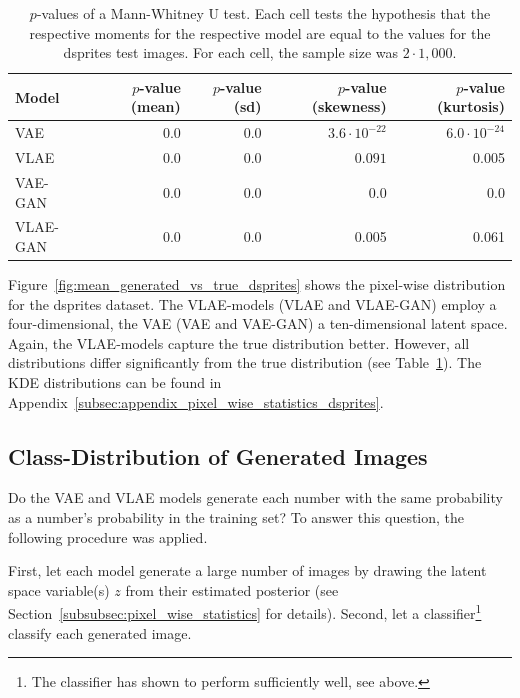 \begin{table}
    \begin{tabular}{lrrrr}
        \toprule
        Model              & $p$-value (mean) & $p$-value (sd) & $p$-value (skewness) & $p$-value (kurtosis) \\
        \midrule
        \ac{VAE}           & $0.0$            & 0.0            & $3.6\cdot 10^{-22}$  & $6.0\cdot 10^{-24}$  \\
        \ac{VLAE}          & 0.0              & $0.0$          & $0.091$              & 0.005                \\
        \ac{VAE}-\ac{GAN}  & 0.0              & 0.0            & 0.0                  & 0.0                  \\
        \ac{VLAE}-\ac{GAN} & 0.0              & $0.0$          & 0.005                & 0.061                \\
        \bottomrule
    \end{tabular}
    \caption{$p$-values of a Mann-Whitney U test. Each cell tests the hypothesis that the respective moments for the respective model are equal to the values for the dsprites test images. For each cell, the sample size was $2\cdot 1,000$.}
    \label{tab:vae-vlae-dsprites}
\end{table}

Figure~\ref{fig:mean_generated_vs_true_dsprites} shows the pixel-wise distribution for the dsprites dataset.
The \ac{VLAE}-models (\ac{VLAE} and \ac{VLAE}-\ac{GAN}) employ a four-dimensional, the \ac{VAE} (\ac{VAE} and \ac{VAE}-\ac{GAN}) a ten-dimensional latent space.
Again, the \ac{VLAE}-models capture the true distribution better.
However, all distributions differ significantly from the true distribution (see Table~\ref{tab:vae-vlae-dsprites}).
The \ac{KDE} distributions can be found in Appendix~\ref{subsec:appendix_pixel_wise_statistics_dsprites}.

\subsection{Class-Distribution of Generated Images}\label{subsec:class-distribution-of-generated-images}

Do the \ac{VAE} and \ac{VLAE} models generate each number with the same probability as a number's probability in the training set?
To answer this question, the following procedure was applied.

First, let each model generate a large number of images by drawing the latent space variable(s) $z$ from their estimated posterior (see Section~\ref{subsubsec:pixel_wise_statistics} for details).
Second, let a classifier\footnote{The classifier has shown to perform sufficiently well, see above.} classify each generated image.

